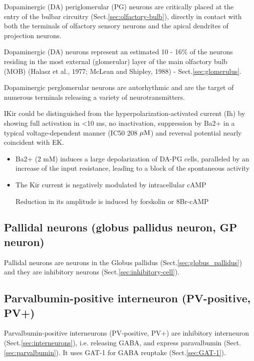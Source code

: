 Dopaminergic (DA) periglomerular (PG) neurons are critically placed at the entry
of the bulbar circuitry (Sect.\ref{sec:olfactory-bulb}), directly in contact
with both the terminals of olfactory sensory neurons and the apical dendrites of projection neurons.

Dopaminergic (DA) neurons represent an estimated 10 - 16\% of the neurons residing
in the most external (glomerular) layer of the main olfactory bulb (MOB) (Halasz
et al., 1977; McLean and Shipley, 1988) - Sect.\ref{sec:glomerulus}.


Dopaminergic perglomerular neurons are autorhythmic and are the target of
numerous terminals releasing a variety of neurotransmitters.


IKir could be distinguished from the hyperpolarization-activated current (Ih) by
showing full activation in <10 ms, no inactivation, suppression by Ba2+ in a
typical voltage-dependent manner (IC50 208 ${\mu\text{M}}$) and reversal potential nearly
coincident with EK.  
\begin{itemize}
  \item  Ba2+ (2 mM) induces a large depolarization of DA-PG cells, paralleled
  by an increase of the input resistance, leading to a block of the spontaneous activity
  
  \item The Kir current is negatively modulated by intracellular cAMP
  
Reduction in its amplitude is induced by forskolin or 8Br-cAMP

  
\end{itemize}

\subsection{Pallidal neurons (globus pallidus neuron, GP neuron)}
\label{sec:Pallidal-neurons}
\label{sec:GP_neurons}
\label{sec:globus-pallidus_neurons}

Pallidal neurons are neurons in the Globus pallidus
(Sect.\ref{sec:globus_pallidus}) and they are inhibitory neurons
(Sect.\ref{sec:inhibitory-cell}).

\subsection{Parvalbumin-positive interneuron (PV-positive, PV+)}
\label{sec:parvalbumin-positive-interneuron}
\label{sec:PV+-neuron}
\label{sec:PV-positive-neuron}

Parvalbumin-positive interneurons (PV-positive, PV+) are inhibitory interneuron
(Sect.\ref{sec:interneurons}), i.e. releasing GABA, and express paravalbumin
(Sect.\ref{sec:parvalbumin}). It uses GAT-1 for GABA reuptake
(Sect.\ref{sec:GAT-1}).

